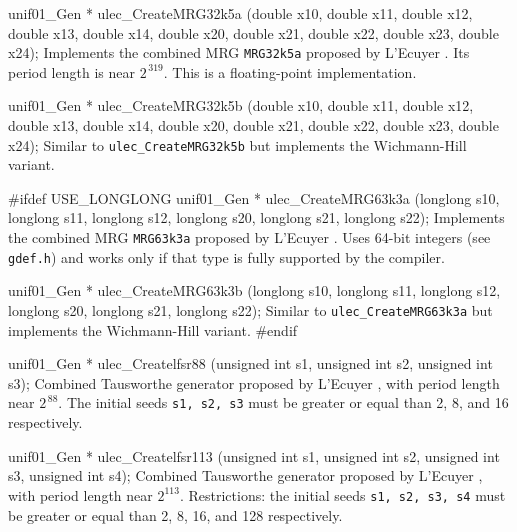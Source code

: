 unif01_Gen * ulec_CreateMRG32k5a (double x10, double x11, double x12,
                                  double x13, double x14, double x20,
                                  double x21, double x22, double x23,
                                  double x24);
\endcode
 \tab Implements the combined MRG {\tt MRG32k5a}
  proposed by L'Ecuyer \cite{rLEC99b}.
%
  Its period length is near $2^{\,319}$.
  This is a floating-point implementation.
 \endtab
\code


unif01_Gen * ulec_CreateMRG32k5b (double x10, double x11, double x12,
                                  double x13, double x14, double x20,
                                  double x21, double x22, double x23,
                                  double x24);
\endcode
 \tab  Similar to {\tt ulec\_CreateMRG32k5b} but implements 
%
   the Wichmann-Hill variant.
 \endtab
\code


#ifdef USE_LONGLONG
unif01_Gen * ulec_CreateMRG63k3a (longlong s10, longlong s11, longlong s12,
                                  longlong s20, longlong s21, longlong s22);
\endcode
 \tab Implements the combined MRG {\tt MRG63k3a}
  proposed by L'Ecuyer \cite{rLEC99b}.
%
  Uses 64-bit integers (see {\tt gdef.h})
  and works only if that type is fully supported by the compiler.
 \endtab
\code


unif01_Gen * ulec_CreateMRG63k3b (longlong s10, longlong s11, longlong s12,
                                  longlong s20, longlong s21, longlong s22);
\endcode
 \tab Similar to {\tt ulec\_CreateMRG63k3a} 
%
   but implements the Wichmann-Hill variant.
 \endtab
\code
#endif


unif01_Gen * ulec_Createlfsr88 (unsigned int s1, unsigned int s2,
                                unsigned int s3);
\endcode
 \tab Combined Tausworthe generator proposed by L'Ecuyer \cite{rLEC96a},
   with period length near $2^{\,88}$. The initial seeds \texttt{s1, s2, s3}
   must be greater or equal than 2, 8, and 16 respectively.
%
 \endtab
\code


unif01_Gen * ulec_Createlfsr113 (unsigned int s1, unsigned int s2,
                                 unsigned int s3, unsigned int s4);
\endcode
 \tab Combined Tausworthe generator proposed by L'Ecuyer \cite{rLEC99a},
   with period length near $2^{113}$. Restrictions: the initial seeds 
%
  \texttt{s1, s2, s3, s4}
   must be greater or equal than 2, 8, 16, and 128 respectively.
 \endtab
\code


